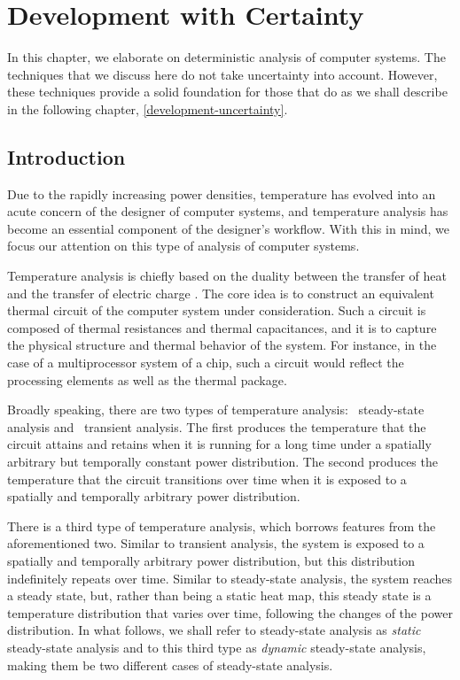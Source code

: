 \chapter{Development with Certainty}

In this chapter, we elaborate on deterministic analysis of computer systems. The
techniques that we discuss here do not take uncertainty into account. However,
these techniques provide a solid foundation for those that do as we shall
describe in the following chapter, \cref{development-uncertainty}.

\section{Introduction}

Due to the rapidly increasing power densities, temperature has evolved into an
acute concern of the designer of computer systems, and temperature analysis has
become an essential component of the designer's workflow. With this in mind, we
focus our attention on this type of analysis of computer systems.

Temperature analysis is chiefly based on the duality between the transfer of
heat and the transfer of electric charge \cite{kreith2000}. The core idea is to
construct an equivalent thermal  circuit of the computer system under
consideration. Such a circuit is composed of thermal resistances and thermal
capacitances, and it is to capture the physical structure and thermal behavior
of the system. For instance, in the case of a multiprocessor system of a chip,
such a circuit would reflect the processing elements as well as the thermal
package.

Broadly speaking, there are two types of temperature analysis: \one\
steady-state analysis and \two\ transient analysis. The first produces the
temperature that the circuit attains and retains when it is running for a long
time under a spatially arbitrary but temporally constant power distribution. The
second produces the temperature that the circuit transitions over time when it
is exposed to a spatially and temporally arbitrary power distribution.

There is a third type of temperature analysis, which borrows features from the
aforementioned two. Similar to transient analysis, the system is exposed to a
spatially and temporally arbitrary power distribution, but this distribution
indefinitely repeats over time. Similar to steady-state analysis, the system
reaches a steady state, but, rather than being a static heat map, this steady
state is a temperature distribution that varies over time, following the changes
of the power distribution. In what follows, we shall refer to steady-state
analysis as \emph{static} steady-state analysis and to this third type as
\emph{dynamic} steady-state analysis, making them be two different cases of
steady-state analysis.

